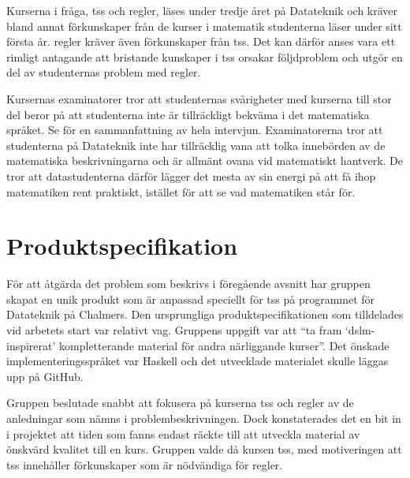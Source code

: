 \documentclass[12pt,a4paper,twoside,openright]{article}
\begin{document}
Kurserna i fråga, \gls{tss} och \gls{regler}, läses under tredje året
på Datateknik och kräver bland annat förkunskaper från de kurser i
matematik studenterna läser under sitt första år. \gls{regler} kräver
även förkunskaper från \gls{tss}. Det kan därför anses vara ett
rimligt antagande att bristande kunskaper i \gls{tss} orsakar
följdproblem och utgör en del av studenternas problem med
\gls{regler}.

Kursernas examinatorer tror att studenternas svårigheter med kurserna
till stor del beror på att studenterna inte är tillräckligt bekväma i
det matematiska språket. Se  för en
sammanfattning av hela intervjun. Examinatorerna tror att studenterna
på Datateknik inte har tillräcklig vana att tolka innebörden av de
matematiska beskrivningarna och är allmänt ovana vid matematiskt
hantverk. De tror att datastudenterna därför lägger det mesta av sin
energi på att få ihop matematiken rent praktiskt, istället för att se
vad matematiken står för.

\newpage

\section{Produktspecifikation}
För att åtgärda det problem som beskrivs i föregående avsnitt har
gruppen skapat en unik produkt som är anpassad speciellt för \gls{tss}
på programmet för Datateknik på Chalmers. Den ursprungliga
produktspecifikationen som tilldelades vid arbetets start var relativt
vag. Gruppens uppgift var att ``ta fram `\gls{dslm}-inspirerat'
kompletterande material för andra närliggande kurser''. Det önskade
implementerings\-språket var Haskell och det utvecklade materialet
skulle läggas upp på GitHub.

Gruppen beslutade snabbt att fokusera på kurserna \gls{tss} och
\gls{regler} av de anledningar som nämns i problembeskrivningen. Dock
konstaterades det en bit in i projektet att tiden som fanns endast
räckte till att utveckla material av önskvärd kvalitet till en
kurs. Gruppen valde då kursen \gls{tss}, med motiveringen att
\gls{tss} innehåller förkunskaper som är nödvändiga för \gls{regler}.
\end{document}
